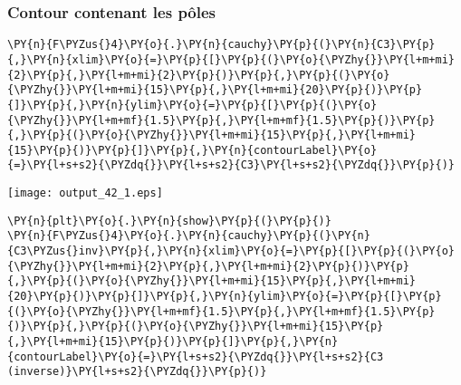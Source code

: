 \subsubsection{Contour contenant les pôles}
\begin{tcolorbox}[breakable, size=fbox, boxrule=1pt, pad at break*=1mm,colback=cellbackground, colframe=cellborder]
\begin{Verbatim}[commandchars=\\\{\}]
\PY{n}{F\PYZus{}4}\PY{o}{.}\PY{n}{cauchy}\PY{p}{(}\PY{n}{C3}\PY{p}{,}\PY{n}{xlim}\PY{o}{=}\PY{p}{[}\PY{p}{(}\PY{o}{\PYZhy{}}\PY{l+m+mi}{2}\PY{p}{,}\PY{l+m+mi}{2}\PY{p}{)}\PY{p}{,}\PY{p}{(}\PY{o}{\PYZhy{}}\PY{l+m+mi}{15}\PY{p}{,}\PY{l+m+mi}{20}\PY{p}{)}\PY{p}{]}\PY{p}{,}\PY{n}{ylim}\PY{o}{=}\PY{p}{[}\PY{p}{(}\PY{o}{\PYZhy{}}\PY{l+m+mf}{1.5}\PY{p}{,}\PY{l+m+mf}{1.5}\PY{p}{)}\PY{p}{,}\PY{p}{(}\PY{o}{\PYZhy{}}\PY{l+m+mi}{15}\PY{p}{,}\PY{l+m+mi}{15}\PY{p}{)}\PY{p}{]}\PY{p}{,}\PY{n}{contourLabel}\PY{o}{=}\PY{l+s+s2}{\PYZdq{}}\PY{l+s+s2}{C3}\PY{l+s+s2}{\PYZdq{}}\PY{p}{)}
\end{Verbatim}
\end{tcolorbox}
\begin{center}
    \texttt{[image: output\_42\_1.eps]}
\end{center}
\begin{tcolorbox}[breakable, size=fbox, boxrule=1pt, pad at break*=1mm,colback=cellbackground, colframe=cellborder]
\begin{Verbatim}[commandchars=\\\{\}]
\PY{n}{plt}\PY{o}{.}\PY{n}{show}\PY{p}{(}\PY{p}{)}
\PY{n}{F\PYZus{}4}\PY{o}{.}\PY{n}{cauchy}\PY{p}{(}\PY{n}{C3\PYZus{}inv}\PY{p}{,}\PY{n}{xlim}\PY{o}{=}\PY{p}{[}\PY{p}{(}\PY{o}{\PYZhy{}}\PY{l+m+mi}{2}\PY{p}{,}\PY{l+m+mi}{2}\PY{p}{)}\PY{p}{,}\PY{p}{(}\PY{o}{\PYZhy{}}\PY{l+m+mi}{15}\PY{p}{,}\PY{l+m+mi}{20}\PY{p}{)}\PY{p}{]}\PY{p}{,}\PY{n}{ylim}\PY{o}{=}\PY{p}{[}\PY{p}{(}\PY{o}{\PYZhy{}}\PY{l+m+mf}{1.5}\PY{p}{,}\PY{l+m+mf}{1.5}\PY{p}{)}\PY{p}{,}\PY{p}{(}\PY{o}{\PYZhy{}}\PY{l+m+mi}{15}\PY{p}{,}\PY{l+m+mi}{15}\PY{p}{)}\PY{p}{]}\PY{p}{,}\PY{n}{contourLabel}\PY{o}{=}\PY{l+s+s2}{\PYZdq{}}\PY{l+s+s2}{C3 (inverse)}\PY{l+s+s2}{\PYZdq{}}\PY{p}{)}
\end{Verbatim}
\end{tcolorbox}
